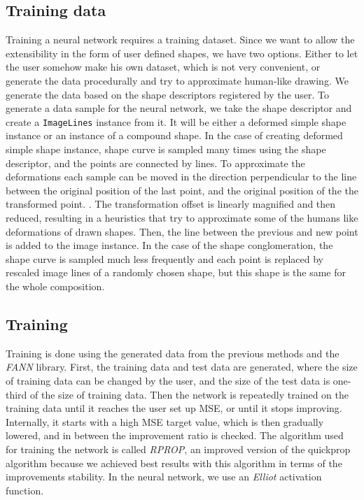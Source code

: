 \subsection{Training data}
Training a neural network requires a training dataset. Since we want to allow the extensibility in the form of user defined shapes, we have two options. Either to let the user somehow make his own dataset, which is not very convenient, or generate the data procedurally and try to approximate human-like drawing. We generate the data based on the shape descriptors registered by the user. To generate a data sample for the neural network, we take the shape descriptor and create a \texttt{ImageLines} instance from it. It will be either a deformed simple shape instance or an instance of a compound shape. In the case of creating deformed simple shape instance, shape curve is sampled many times using the shape descriptor, and the points are connected by lines. 
To approximate the deformations each sample can be moved in the direction perpendicular to the line between the original position of the last point, and the original position of the the transformed point. . The transformation  offset is linearly magnified and then reduced, resulting in a heuristics that try to approximate some of the humans like deformations of drawn shapes. Then, the line between the previous and new point is added to the image instance. In the case of the shape conglomeration, the shape curve is sampled much less frequently and each point is replaced by rescaled image lines of a randomly chosen shape, but this shape is the same for the whole composition.

\subsection{Training}
Training is done using the generated data from the previous methods and the \emph{FANN} library. First, the training data and test data are generated, where the size of training data can be changed by the user, and the size of the test data is one-third of the size of training data. Then the network is repeatedly trained on the training data until it reaches the user set up MSE, or until it stops improving. Internally, it starts with a high MSE target value, which is then gradually lowered, and in between the improvement ratio is checked. The algorithm used for training the network is called \emph{RPROP}, an improved version of the quickprop algorithm because we achieved best results with this algorithm in terms of the improvements stability. In the neural network, we use an \emph{Elliot} activation function.

